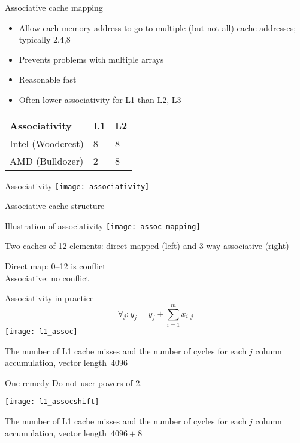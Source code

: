 \begin{numberedframe}{Associative cache mapping}  
  \begin{itemize}
  \item Allow each memory address to go to multiple (but not all) cache addresses;
    typically 2,4,8
  \item Prevents problems with multiple arrays
  \item Reasonable fast
  \item Often lower associativity for L1 than L2, L3
  \end{itemize}
  \begin{tabular}{|l|ll|}
    \toprule
    Associativity&L1&L2\\
    \midrule
    Intel (Woodcrest)&8&8\\
    AMD (Bulldozer)&2&8\\
    \bottomrule
  \end{tabular}
\end{numberedframe}

\begin{numberedframe}{Associativity}
  \texttt{[image: associativity]}

  Associative cache structure
\end{numberedframe}

\begin{numberedframe}{Illustration of associativity}
\texttt{[image: assoc-mapping]}

Two caches of 12 elements: direct mapped (left) and 3-way associative (right)

Direct map: 0--12 is conflict\\ Associative: no conflict
\end{numberedframe}

\begin{numberedframe}{Associativity in practice}
\[ \forall_j\colon y_j= y_j+\sum_{i=1}^mx_{i,j} \]
  \texttt{[image: l1\_assoc]}

The number of L1 cache misses and the number of cycles for
    each $j$ column accumulation, vector length~$4096$
\end{numberedframe}

\begin{numberedframe}{One remedy}
Do not user powers of 2.

  \texttt{[image: l1\_assocshift]}

The number of L1 cache misses and the number of cycles for
    each $j$ column accumulation, vector length~$4096+8$
\end{numberedframe}

